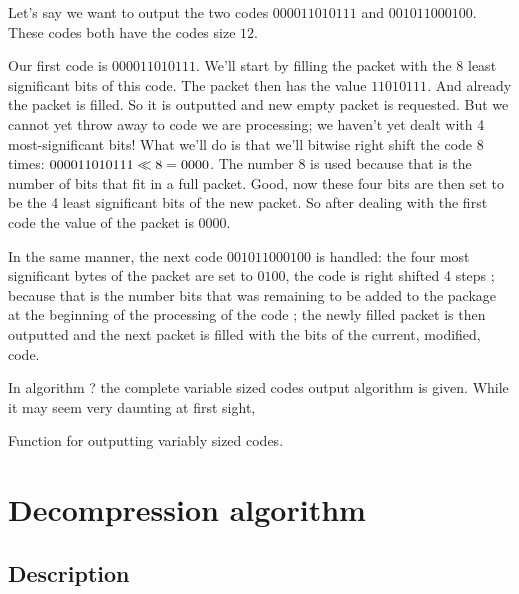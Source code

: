 \begin{refsection}
Let's say we want to output the two codes $0000 1101 0111$ and $0010
1100 0100$. These codes both have the codes size $12$.

Our first code is $0000 1101 0111$. We'll start by filling the packet
with the 8 least significant bits of this code. The packet then has
the value $1101 0111$. And already the packet is filled. So it is
outputted and new empty packet is requested. But we cannot yet throw
away to code we are processing; we haven't yet dealt with 4
most-significant bits! What we'll do is that we'll bitwise right shift
the code 8 times: $0000 1101 0111 \ll 8 = 0000$. The number $8$ is used
because that is the number of bits that fit in a full packet. Good,
now these four bits are then set to be the 4 least significant bits of
the new packet. So after dealing with the first code the value of the
packet is $0000$.

In the same manner, the next code $0010 1100 0100$ is handled: the
four most significant bytes of the packet are set to $0100$, the code
is right shifted 4 steps ; because that is the number bits that was
remaining to be added to the package at the beginning of the
processing of the code ; the newly filled packet is then outputted and
the next packet is filled with the bits of the current, modified,
code.

In algorithm ? the complete variable sized codes output algorithm is
given. While it may seem very daunting at first sight,


\begin{algorithm}[H]
  \caption{Function for outputting variably sized codes.}
  \label{alg:variable-codes-output}
  \begin{algorithmic}[1]



  \end{algorithmic}
\end{algorithm}


\section{Decompression algorithm}

\subsection{Description}


\end{refsection}
